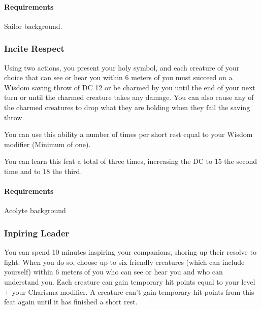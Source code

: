     \paragraph{Requirements} Sailor background.
\subsubsection{Incite Respect} \label{feat::inciterespect}
    Using two actions, you present your holy symbol, and each creature of your choice that can see or hear you within 6 meters of you must succeed on a Wisdom saving throw of DC 12 or be charmed by you until the end of your next turn or until the charmed creature takes any damage.
    You can also cause any of the charmed creatures to drop what they are holding when they fail the saving throw.

    You can use this ability a number of times per short rest equal to your Wisdom modifier (Minimum of one).

    You can learn this feat a total of three times, increasing the DC to 15 the second time and to 18 the third.
    \paragraph{Requirements} Acolyte background
\subsubsection{Inpiring Leader} \label{feat::inspiringleader}
    You can spend 10 minutes inspiring your companions, shoring up their resolve to fight.
    When you do so, choose up to six friendly creatures (which can include yourself) within 6 meters of you who can see or hear you and who can understand you.
    Each creature can gain temporary hit points equal to your level + your Charisma modifier.
    A creature can't gain temporary hit points from this feat again until it has finished a short rest.
